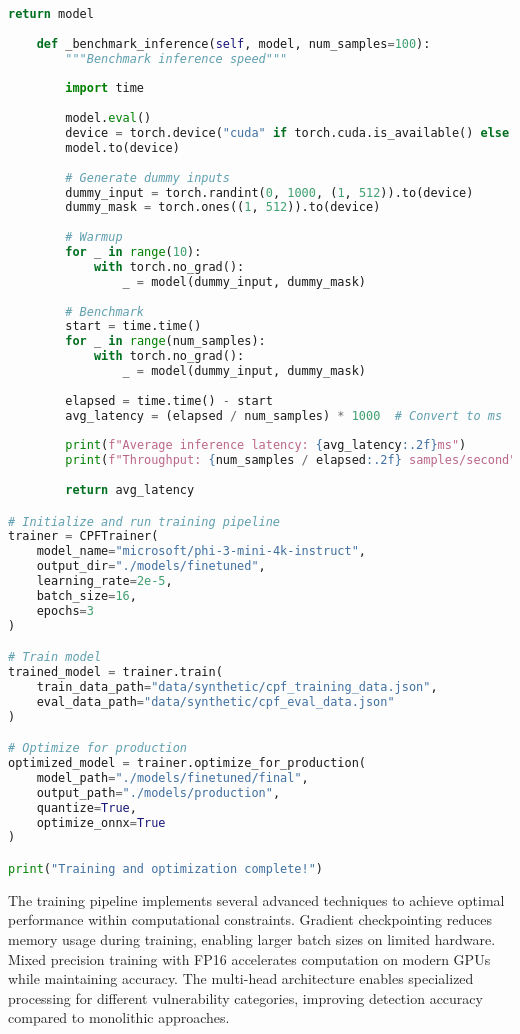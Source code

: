\documentclass[11pt,a4paper]{article}
\begin{document}
\begin{lstlisting}[language=Python, caption=CPF Model Training Pipeline]
        return model
    
    def _benchmark_inference(self, model, num_samples=100):
        """Benchmark inference speed"""
        
        import time
        
        model.eval()
        device = torch.device("cuda" if torch.cuda.is_available() else "cpu")
        model.to(device)
        
        # Generate dummy inputs
        dummy_input = torch.randint(0, 1000, (1, 512)).to(device)
        dummy_mask = torch.ones((1, 512)).to(device)
        
        # Warmup
        for _ in range(10):
            with torch.no_grad():
                _ = model(dummy_input, dummy_mask)
        
        # Benchmark
        start = time.time()
        for _ in range(num_samples):
            with torch.no_grad():
                _ = model(dummy_input, dummy_mask)
        
        elapsed = time.time() - start
        avg_latency = (elapsed / num_samples) * 1000  # Convert to ms
        
        print(f"Average inference latency: {avg_latency:.2f}ms")
        print(f"Throughput: {num_samples / elapsed:.2f} samples/second")
        
        return avg_latency

# Initialize and run training pipeline
trainer = CPFTrainer(
    model_name="microsoft/phi-3-mini-4k-instruct",
    output_dir="./models/finetuned",
    learning_rate=2e-5,
    batch_size=16,
    epochs=3
)

# Train model
trained_model = trainer.train(
    train_data_path="data/synthetic/cpf_training_data.json",
    eval_data_path="data/synthetic/cpf_eval_data.json"
)

# Optimize for production
optimized_model = trainer.optimize_for_production(
    model_path="./models/finetuned/final",
    output_path="./models/production",
    quantize=True,
    optimize_onnx=True
)

print("Training and optimization complete!")
\end{lstlisting}

The training pipeline implements several advanced techniques to achieve optimal performance within computational constraints. Gradient checkpointing reduces memory usage during training, enabling larger batch sizes on limited hardware. Mixed precision training with FP16 accelerates computation on modern GPUs while maintaining accuracy. The multi-head architecture enables specialized processing for different vulnerability categories, improving detection accuracy compared to monolithic approaches.
\end{document}
